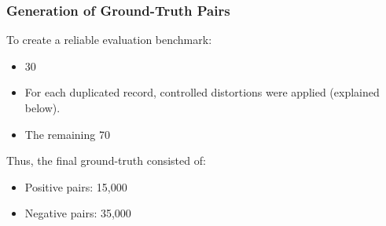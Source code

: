 \documentclass[twoside]{article}
\begin{document}
\subsubsection{Generation of Ground-Truth Pairs}
To create a reliable evaluation benchmark:
	\begin{itemize}
		\item 	30%
		\item	For each duplicated record, controlled distortions were applied (explained below).
		\item 	The remaining 70%
	\end{itemize}
Thus, the final ground-truth consisted of:
	\begin{itemize}
	\item  Positive pairs: 15,000
	\item 	Negative pairs: 35,000
	\end{itemize}
\end{document}
